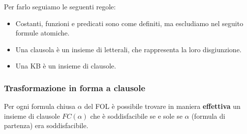 Per farlo seguiamo le seguenti regole:
\begin{itemize}
	\item Costanti, funzioni e predicati sono come definiti, ma escludiamo nel seguito formule atomiche.
	\item Una clausola \`e un insieme di letterali, che rappresenta la loro disgiunzione.
	\item Una KB \`e un insieme di clausole.
\end{itemize}

\subsubsection{Trasformazione in forma a clausole}
\begin{theorem}
	Per ogni formula chiusa $\alpha$ del FOL \`e possibile trovare in maniera \textbf{effettiva} un insieme
	di clausole $FC(\alpha)$ che \`e soddisfacibile se e sole se $\alpha$ (formula di partenza) era soddisfacibile.
\end{theorem}

